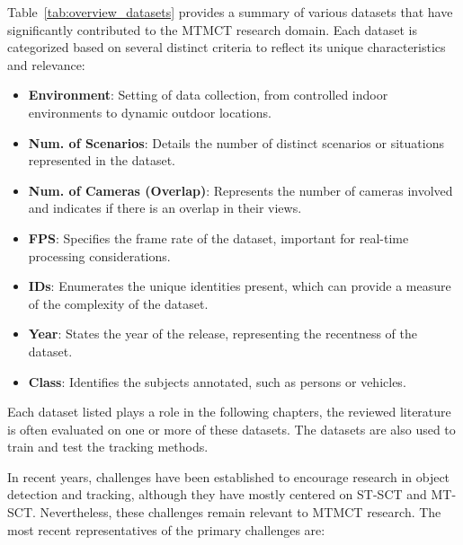 Table~\ref{tab:overview_datasets} provides a summary of various datasets that have significantly contributed to the MTMCT research domain. Each dataset is categorized based on several distinct criteria to reflect its unique characteristics and relevance:

\begin{itemize}
    \item \textbf{Environment}: Setting of data collection, from controlled indoor environments to dynamic outdoor locations.
    \item \textbf{Num. of Scenarios}: Details the number of distinct scenarios or situations represented in the dataset.
    \item \textbf{Num. of Cameras (Overlap)}: Represents the number of cameras involved and indicates if there is an overlap in their views.
    \item \textbf{FPS}: Specifies the frame rate of the dataset, important for real-time processing considerations.
    \item \textbf{IDs}: Enumerates the unique identities present, which can provide a measure of the complexity of the dataset.
    \item \textbf{Year}: States the year of the release, representing the recentness of the dataset.
    \item \textbf{Class}: Identifies the subjects annotated, such as persons or vehicles.
\end{itemize}

Each dataset listed plays a role in the following chapters, the reviewed literature is often evaluated on one or more of these datasets. The datasets are also used to train and test the tracking methods.

In recent years, challenges have been established to encourage research in object detection and tracking, although they have mostly centered on ST-SCT and MT-SCT. Nevertheless, these challenges remain relevant to MTMCT research. The most recent representatives of the primary challenges are:

